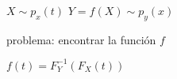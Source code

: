 \documentclass{article}
\begin{document}
$X\sim p_x(t)$
$Y = f(X)\sim p_y(x)$

problema: encontrar la función $f$

$f(t) = F^{-1}_Y(F_X(t))$
\end{document}

